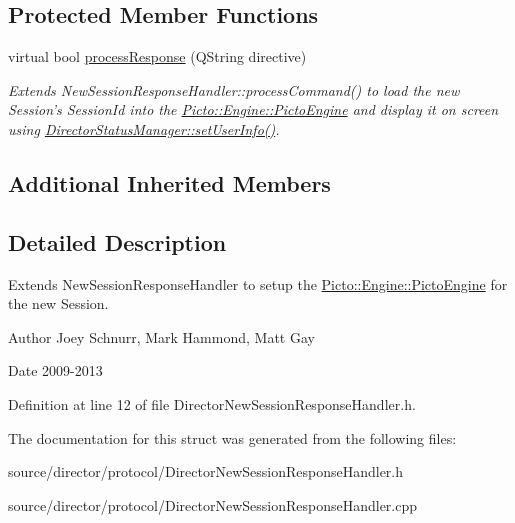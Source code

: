 \subsection*{Protected Member Functions}
\begin{DoxyCompactItemize}
\item 
\hypertarget{struct_director_new_session_response_handler_a8cbf7d69389728fbefca4003b822e534}{virtual bool \hyperlink{struct_director_new_session_response_handler_a8cbf7d69389728fbefca4003b822e534}{process\-Response} (Q\-String directive)}\label{struct_director_new_session_response_handler_a8cbf7d69389728fbefca4003b822e534}

\begin{DoxyCompactList}\small\item\em Extends New\-Session\-Response\-Handler\-::process\-Command() to load the new Session's Session\-Id into the \hyperlink{class_picto_1_1_engine_1_1_picto_engine}{Picto\-::\-Engine\-::\-Picto\-Engine} and display it on screen using \hyperlink{class_director_status_manager_a10d0fc15364fa73814c90c9c5300708c}{Director\-Status\-Manager\-::set\-User\-Info()}. \end{DoxyCompactList}\end{DoxyCompactItemize}
\subsection*{Additional Inherited Members}


\subsection{Detailed Description}
Extends New\-Session\-Response\-Handler to setup the \hyperlink{class_picto_1_1_engine_1_1_picto_engine}{Picto\-::\-Engine\-::\-Picto\-Engine} for the new Session. 

\begin{DoxyAuthor}{Author}
Joey Schnurr, Mark Hammond, Matt Gay 
\end{DoxyAuthor}
\begin{DoxyDate}{Date}
2009-\/2013 
\end{DoxyDate}


Definition at line 12 of file Director\-New\-Session\-Response\-Handler.\-h.



The documentation for this struct was generated from the following files\-:\begin{DoxyCompactItemize}
\item 
source/director/protocol/Director\-New\-Session\-Response\-Handler.\-h\item 
source/director/protocol/Director\-New\-Session\-Response\-Handler.\-cpp\end{DoxyCompactItemize}
